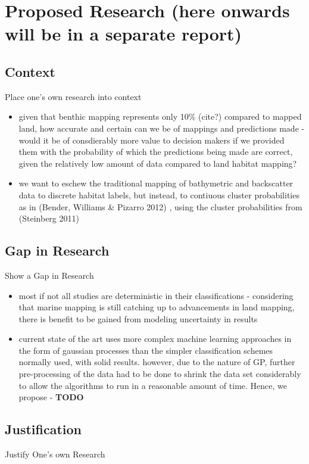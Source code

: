 \documentclass[12pt]{article}
\begin{document}
\section{Proposed Research (here onwards will be in a separate report)}
\subsection{Context}
Place one's own research into context
\begin{itemize}
\item given that benthic mapping represents only 10\% (cite?) compared to mapped land, how accurate and certain can we be of mappings and predictions made - would it be of consdierably more value to decision makers if we provided them with the probability of which the predictions being made are correct, given the relatively low amount of data compared to land habitat mapping?
\item we want to eschew the traditional mapping of bathymetric and backscatter data to discrete habitat labels, but instead, to contiuous cluster probabilities as in (Bender, Williams \& Pizarro 2012) \cite{bender12}, using the cluster probabilities from (Steinberg 2011) \cite{steinberg11}
\end{itemize}

\subsection{Gap in Research}
Show a Gap in Research
\begin{itemize}
\item most if not all studies are deterministic in their classifications - considering that marine mapping is still catching up to advancements in land mapping, there is benefit to be gained from modeling uncertainty in results
\item current state of the art uses more complex machine learning approaches in the form of gaussian processes than the simpler classification schemes normally used, with solid results. however, due to the nature of GP, further pre-processing of the data had to be done to shrink the data set considerably to allow the algorithms to run in a reasonable amount of time\cite{bender12}. Hence, we propose - \textbf{TODO}
\end{itemize}

\subsection{Justification}
Justify One's own Research
\end{document}
